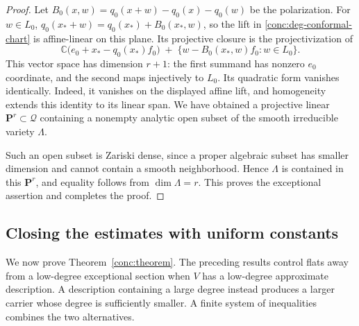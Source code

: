 \begin{proof}
Let
\(B_0(x,w)=q_0(x+w)-q_0(x)-q_0(w)\) be the polarization.
For \(w\in L_0\),
\(q_0(x_*+w)=q_0(x_*)+B_0(x_*,w)\), so the lift in
\eqref{conc:deg-conformal-chart} is affine-linear on this plane.
Its projective closure is the projectivization of
\[
 \mathbb{C}\bigl(e_0+x_*-q_0(x_*)f_0\bigr)
 \; +\;
 \{w-B_0(x_*,w)f_0:w\in L_0\}.
\]
This vector space has dimension \(r+1\): the first summand
has nonzero \(e_0\) coordinate, and the second maps injectively
to \(L_0\).  Its quadratic form vanishes identically.  Indeed,
it vanishes on the displayed affine lift, and homogeneity extends
this identity to its linear span.  We have obtained a projective
linear \(\mathbf{P}^r\subset\mathcal Q\) containing a
nonempty analytic open subset of the smooth irreducible variety
\(\Lambda\).

Such an open subset is Zariski dense, since a proper algebraic
subset has smaller dimension and cannot contain a smooth
neighborhood.  Hence \(\Lambda\) is contained in this
\(\mathbf{P}^r\), and equality follows from
\(\dim\Lambda=r\).  This proves the exceptional assertion
and completes the proof.
\end{proof}


\subsection{Closing the estimates with uniform constants}
\label{conc:uniform-completion}

We now prove Theorem~\ref{conc:theorem}.  The preceding results control
flats away from a low-degree exceptional section when $V$ has a
low-degree approximate description.  A description containing a large
degree instead produces a larger carrier whose degree is sufficiently
smaller.  A finite system of inequalities combines the two alternatives.

